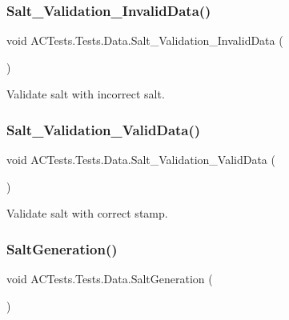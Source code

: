 \subsubsection{\texorpdfstring{Salt\+\_\+\+Validation\+\_\+\+Invalid\+Data()}{Salt\_Validation\_InvalidData()}}
{\footnotesize\ttfamily void A\+C\+Tests.\+Tests.\+Data.\+Salt\+\_\+\+Validation\+\_\+\+Invalid\+Data (\begin{DoxyParamCaption}{ }\end{DoxyParamCaption})}



Validate salt with incorrect salt. 

\mbox{\label{class_a_c_tests_1_1_tests_1_1_data_ab24c6c95a34b4749527df5ee38aa9853}} 
\subsubsection{\texorpdfstring{Salt\+\_\+\+Validation\+\_\+\+Valid\+Data()}{Salt\_Validation\_ValidData()}}
{\footnotesize\ttfamily void A\+C\+Tests.\+Tests.\+Data.\+Salt\+\_\+\+Validation\+\_\+\+Valid\+Data (\begin{DoxyParamCaption}{ }\end{DoxyParamCaption})}



Validate salt with correct stamp. 

\mbox{\label{class_a_c_tests_1_1_tests_1_1_data_a43cb9406abb4801fded880d31ef04725}} 
\subsubsection{\texorpdfstring{Salt\+Generation()}{SaltGeneration()}}
{\footnotesize\ttfamily void A\+C\+Tests.\+Tests.\+Data.\+Salt\+Generation (\begin{DoxyParamCaption}{ }\end{DoxyParamCaption})}



